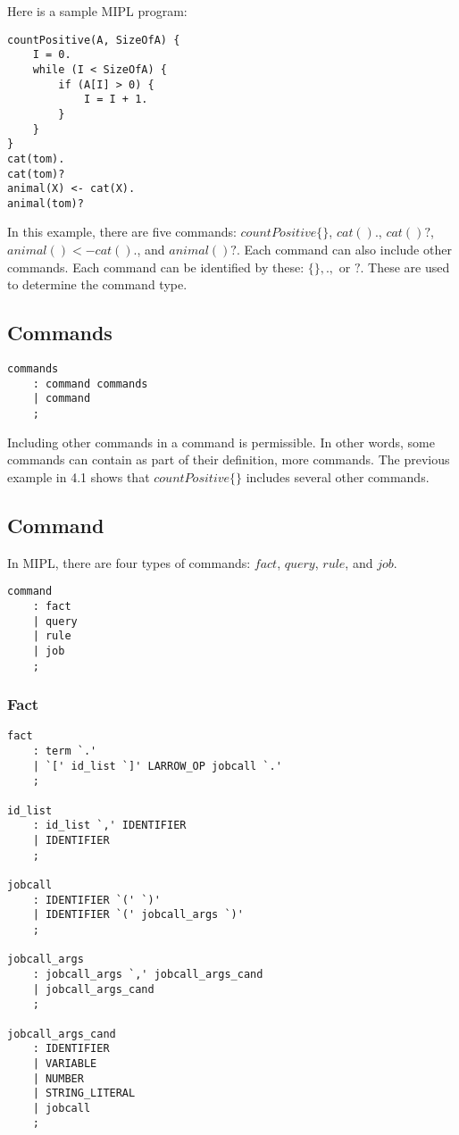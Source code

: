 \documentclass[prodmode,acmtecs]{acmsmall}
\begin{document}
Here is a sample MIPL program:

\begin{lstlisting}
countPositive(A, SizeOfA) {
    I = 0.
    while (I < SizeOfA) {
        if (A[I] > 0) {
            I = I + 1.
        }
    }
}
cat(tom).
cat(tom)?
animal(X) <- cat(X).
animal(tom)?
\end{lstlisting}

In this example, there are five commands:
 $countPositive\{\}$, $cat().$, $cat()?$, $animal() <- cat().$, and $animal()?$. Each
 command can also include other commands. Each command can be identified by these:
 $\{\}, .,$ or $?$. These are used to determine the command type.
\medskip

\subsection{Commands}

\begin{lstlisting}
commands
	: command commands
	| command
	;
\end{lstlisting}

Including other commands in a command is permissible. In other words, some commands
 can contain as part of their definition, more commands. The previous example in 4.1
 shows that $countPositive\{\}$ includes several other commands. 
\medskip

\subsection{Command}

In MIPL, there are four types of commands: $fact$, $query$, $rule$, and $job$.

\begin{lstlisting}
command
	: fact
	| query
	| rule
	| job
	;
\end{lstlisting}
\medskip


\subsubsection{Fact}
\begin{lstlisting}
fact
	: term `.'			
	| `[' id_list `]' LARROW_OP jobcall `.'
	;

id_list
	: id_list `,' IDENTIFIER
	| IDENTIFIER		
	;

jobcall
	: IDENTIFIER `(' `)'
	| IDENTIFIER `(' jobcall_args `)'
	;

jobcall_args
	: jobcall_args `,' jobcall_args_cand
	| jobcall_args_cand
	;

jobcall_args_cand
	: IDENTIFIER
	| VARIABLE
	| NUMBER
	| STRING_LITERAL
	| jobcall
	;
\end{lstlisting}
\end{document}
